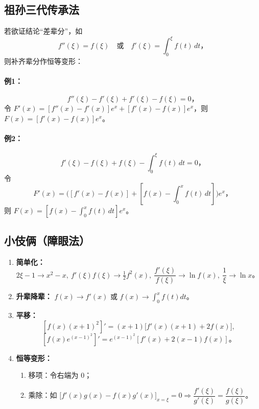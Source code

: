 \subsection{祖孙三代传承法}
若欲证结论“差辈分”，如
\[
    f''(\xi)=f(\xi)\quad\text{或}\quad f'(\xi)=\int_0^\xi f(t)\,dt，
\]
则补齐辈分作恒等变形：

\paragraph{例1：}
\[
    f''(\xi)-f'(\xi)+f'(\xi)-f(\xi)=0，
\]
令 $F'(x)=[f''(x)-f'(x)]e^x + [f'(x)-f(x)]e^x$，则
$F(x)=[f'(x)-f(x)]e^x$。

\paragraph{例2：}
\[
    f'(\xi)-f(\xi)+f(\xi)-\int_0^\xi f(t)\,dt = 0，
\]
令
\[
    F'(x)=\big([f'(x)-f(x)]+[f(x)-\int_0^x f(t)\,dt]\big)e^x，
\]
则 $F(x)=\left[f(x)-\int_0^x f(t)\,dt\right]e^x$。

\subsection{小伎俩（障眼法）}
\begin{enumerate}[label=(\arabic*)]
    \item \textbf{简单化：}
          $2\xi-1\rightarrow x^2-x,\ f'(ξ)f(ξ)\rightarrow\frac{1}{2}f^2(x),\
              \dfrac{f'(ξ)}{f(ξ)}\rightarrow\ln f(x),\ \dfrac{1}{ξ}\rightarrow\ln x$。

    \item \textbf{升辈降辈：}
          $f(x)\to f'(x)$ 或 $f(x)\to \int_0^x f(t)dt$。

    \item \textbf{平移：}
          \[
              [f(x)(x+1)^2]'=(x+1)\big[f'(x)(x+1)+2f(x)\big],
          \]
          \[
              [f(x)e^{(x-1)^2}]'=e^{(x-1)^2}[f'(x)+2(x-1)f(x)]。
          \]

    \item \textbf{恒等变形：}
          \begin{enumerate}
              \item 移项：令右端为 0；
              \item 乘除：如 $\big[f'(x)g(x)-f(x)g'(x)\big]_{x=\xi}=0 \Rightarrow \dfrac{f'(ξ)}{g'(ξ)}=\dfrac{f(ξ)}{g(ξ)}$。
          \end{enumerate}
\end{enumerate}

